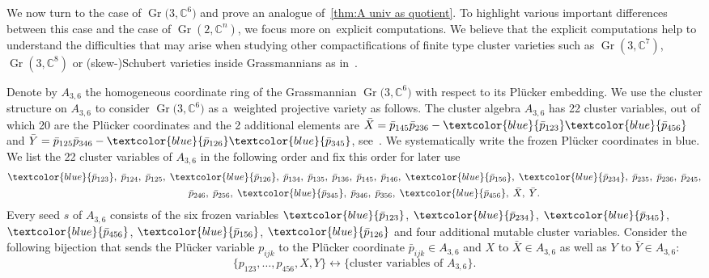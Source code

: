 \documentclass[10pt,a4paper]{amsart}
\newcommand{\thref}[1]{\ref{#1}}
\numberwithin{equation}{section}
\DeclareMathOperator{\Gr}{Gr}
\begin{document}
We now turn to the case of $\Gr\big(3,\mathbb C^6\big)$ and prove an analogue of~\thref{thm:A univ as quotient}. To highlight various important differences between this case and the case of $\Gr(2,\mathbb C^n)$, we focus more on~explicit computations.
We believe that the explicit computations help to understand the difficulties that may arise when studying other compactifications of finite type cluster varieties such as $\Gr(3,\mathbb C^7)$, $\Gr(3,\mathbb C^8)$ or (skew-)Schubert varieties inside Grassmannians as in~\cite{SSBW}.


Denote by $A_{3,6}$ the homogeneous coordinate ring of the Grassmannian $\Gr\big(3,\mathbb C^6\big)$ with res\-pect to its Pl\"ucker embedding.
We use the cluster structure on $A_{3,6}$ to consider $\Gr\big(3,\mathbb C^6\big) $ as a~weighted projective variety
as follows.
The cluster algebra $A_{3,6}$ has 22 cluster variables, out of which 20 are the Pl\"ucker coordinates and the 2 additional elements are $\bar X=\bar p_{145}\bar p_{236}-\textcolor{blue}{\bar p_{123}}\textcolor{blue}{\bar p_{456}}$ and $\bar Y=\bar p_{125}\bar p_{346}-\textcolor{blue}{\bar p_{126}}\textcolor{blue}{\bar p_{345}}$, see~\cite[Theorem~6]{Sco06}.
We systematically write the frozen Pl\"ucker coordinates in {\color{blue}blue}.
We list the 22 cluster variables of $A_{3,6}$ in the following order and fix this order for later use
\begin{gather}\nonumber
\textcolor{blue}{\bar p_{123}},\;\bar p_{124},\;\bar p_{125},\; \textcolor{blue}{\bar p_{126}},\;\bar p_{134},\;\bar p_{135},\;\bar p_{136},\;\bar p_{145},\;\bar p_{146},\;\textcolor{blue}{\bar p_{156}},\;
\textcolor{blue}{\bar p_{234}},\;\bar p_{235},\;\bar p_{236},\;
\bar p_{245},
\\ \qquad
\bar p_{246},\;\bar p_{256},\; \textcolor{blue}{\bar p_{345}},\;\bar p_{346},\;\bar p_{356},\;\textcolor{blue}{\bar p_{456}},\;\bar X,\;\bar Y.
\label{eq:order variables}
\end{gather}
Every seed $s$ of $A_{3,6}$ consists of the six frozen variables $\textcolor{blue}{\bar p_{123}}$, $\textcolor{blue}{\bar p_{234}}$, $\textcolor{blue}{\bar p_{345}}$, $\textcolor{blue}{\bar p_{456}}$, $\textcolor{blue}{\bar p_{156}}$, $\textcolor{blue}{\bar p_{126}}$
and four additional mutable cluster variables.
Consider the following bijection that sends the Pl\"ucker variable $p_{ijk}$ to the Pl\"ucker coordinate $\bar p_{ijk}\in A_{3,6}$ and $X$ to $\bar X\in A_{3,6}$ as well as $Y$ to $\bar Y\in A_{3,6}$:
\begin{equation}\label{eq:identification}
 \{p_{123}, \dots , p_{456}, X,Y \} \longleftrightarrow \{ \text{cluster variables of }A_{3,6}\}.
\end{equation}
\end{document}
